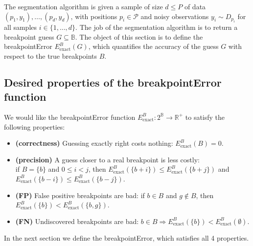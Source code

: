 \documentclass{article}
\newcommand{\RR}{\mathbb{R}}
\begin{document}
The segmentation algorithm is given a sample of size $d \leq P$ of
data $(p_1, y_1), \dots, (p_d, y_d)$, with positions $p_i\in\mathcal
P$ and noisy observations $y_i\sim D_{p_i}$ for all samples $i\in\{1,
\dots, d\}$. The job of the segmentation algorithm is to return a
breakpoint guess $G\subseteq \mathbb B$. The object of this section is to
define the breakpointError $E^B_{\text{exact}}(G)$, which quantifies
the accuracy of the guess $G$ with respect to the true breakpoints
$B$.

\subsection{Desired properties of the breakpointError function}
\label{sec:desired-properties}

We would like the breakpointError function $E^B_{\text{exact}}:
2^{\mathbb B}\rightarrow \RR^+$ to satisfy the following properties:

\begin{itemize}
\item \textbf{(correctness)} Guessing exactly right costs nothing:
  $E^B_{\text{exact}}(B)=0$.
\item \textbf{(precision)} A guess closer to a real breakpoint is less
  costly:\\if $B=\{b\}$ and $0\leq i<j$, then
  $E^B_{\text{exact}}(\{b+i\})\leq E^B_{\text{exact}}(\{b+j\})$ and
  $E^B_{\text{exact}}(\{b-i\})\leq E^B_{\text{exact}}(\{b-j\})$.
\item \textbf{(FP)} False positive breakpoints are
  bad: if $b\in B$ and $g\not\in B$, then $E^B_{\text{exact}} (\{b\}) <
  E^B_{\text{exact}} (\{b,g\})$.
\item \textbf{(FN)} Undiscovered breakpoints are bad:
  $b\in B\Rightarrow E^B_{\text{exact}}(\{b\}) < E^B_{\text{exact}} (\emptyset)$.
\end{itemize}

In the next section we define the breakpointError, which satisfies all
4 properties. 


\end{document}

